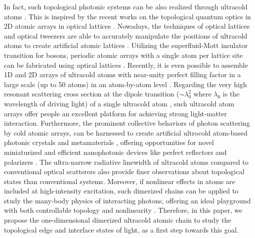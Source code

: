 \documentclass[aps,pra,reprint,groupedaddress,nofootinbib,longbibliography,showpacs]{revtex4-1}
\begin{document}
In fact, such topological photonic systems can be also realized through ultracold atoms \cite{yelinPRL20172,perczelPRA2017}. This is inspired by the recent works on the topological quantum optics in 2D atomic arrays in optical lattices \cite{yelinPRL20172}. Nowadays, the techniques of optical lattices \cite{blochNaturephys2005} and optical tweezers \cite{lesterPRL2015} are able to accurately manipulate the positions of ultracold atoms to create artificial atomic lattices \cite{zollerNaturephys2016}. Utilizing the superfluid-Mott insulator transition for bosons, periodic atomic arrays with a single atom per lattice site can be fabricated using optical lattices \cite{greinerNature2002,shersonNature2010,bakrNature2011,bakrScience2010,weitenbergNature2011}. Recently, it is even possible to assemble 1D and 2D arrays of ultracold atoms with near-unity perfect filling factor in a large scale (up to 50 atoms) in an atom-by-atom level \cite{endresScience2016,lahayeScience2016}. Regarding the very high resonant scattering cross section at the dipole transition ($\sim\lambda_0^2$ where $\lambda_0$ is the wavelength of driving light) of a single ultracold atom \cite{guerin2017light}, such ultracold atom arrays offer people an excellent platform for achieving strong light-matter interaction. Furthermore, the prominent collective behaviors of photon scattering by cold atomic arrays, can be harnessed to create artificial ultrocold atom-based photonic crystals and metamaterials \cite{jenkinsPRA2012}, offering opportunities for novel miniaturized and efficient nanophotonic devices like perfect reflectors \cite{bettlesPRL2016,yelinPRL2017} and polarizers \cite{wangOE2017}. The ultra-narrow radiative linewidth of ultracold atoms \cite{Schilder2016} compared to conventional optical scatterers also provide finer observations about topological states than conventional systems. Moreover, if nonlinear effects in atoms are included at high-intensity excitation, such dimerized chains can be applied to study the many-body physics of interacting photons, offering an ideal playground with both controllable topology and nonlinearity \cite{changNaturephys2007, yelinPRL2017,yelinPRL20172}. Therefore, in this paper, we propose the one-dimensional dimerized ultracold atomic chain to study the topological edge and interface states of light, as a first step towards this goal. 
\end{document}
